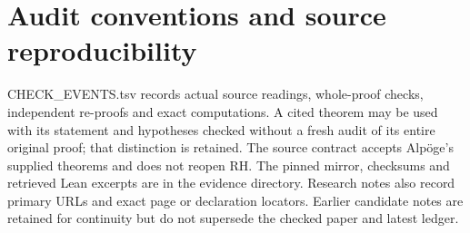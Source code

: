 \documentclass[11pt,a4paper]{article}
\theoremstyle{definition}
\begin{document}
\section{Audit conventions and source reproducibility}
CHECK\_EVENTS.tsv records actual source readings, whole-proof checks,
independent re-proofs and exact computations. A cited theorem may be
used with its statement and hypotheses checked without a fresh audit of
its entire original proof; that distinction is retained. The source
contract accepts Alp\"oge's supplied theorems and does not reopen RH.
The pinned mirror, checksums and retrieved Lean excerpts are in the
evidence directory. Research notes also record primary URLs and exact
page or declaration locators. Earlier candidate notes are retained for
continuity but do not supersede the checked paper and latest ledger.
\end{document}
